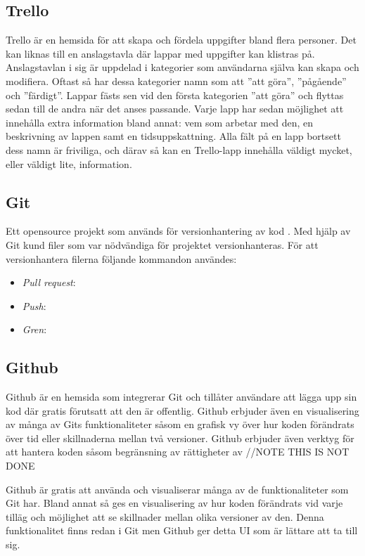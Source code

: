 \subsection*{Trello}
Trello är en hemsida för att skapa och fördela uppgifter bland flera personer. Det kan liknas till en anslagstavla där lappar med uppgifter kan klistras på. Anslagstavlan i sig är uppdelad i kategorier som användarna själva kan skapa och modifiera. Oftast så har dessa kategorier namn som att ''att göra'', ''pågående'' och ''färdigt''. Lappar fästs sen vid den första kategorien ''att göra'' och flyttas sedan till de andra när det anses passande. Varje lapp har sedan möjlighet att innehålla extra information bland annat: vem som arbetar med den, en beskrivning av lappen samt en tidsuppskattning. Alla fält på en lapp bortsett dess namn är friviliga, och därav så kan en Trello-lapp innehålla väldigt mycket, eller väldigt lite, information.

\subsection{Git}
Ett opensource projekt som används för versionhantering av kod \cite{Git52:online}. Med hjälp av Git kund filer som var nödvändiga för projektet versionhanteras. För att versionhantera filerna följande kommandon användes: 
\begin{itemize}
	\item \textit{Pull request}:
	\item \textit{Push}:
	\item \textit{Gren}:
\end{itemize}

\subsection*{Github}
Github är en hemsida som integrerar Git och tillåter användare att lägga upp sin kod där gratis förutsatt att den är offentlig. Github erbjuder även en visualisering av många av Gits funktionaliteter såsom en grafisk vy över hur koden förändrats över tid eller skillnaderna mellan två versioner. Github erbjuder även verktyg för att hantera koden såsom begränsning av rättigheter av //NOTE THIS IS NOT DONE 

Github är gratis att använda och visualiserar många av de funktionaliteter som Git har. Bland annat så ges en visualisering av hur koden förändrats vid varje tilläg och möjlighet att se skillnader mellan olika versioner av den. Denna funktionalitet finns redan i Git men Github ger detta UI som är lättare att ta till sig. 

